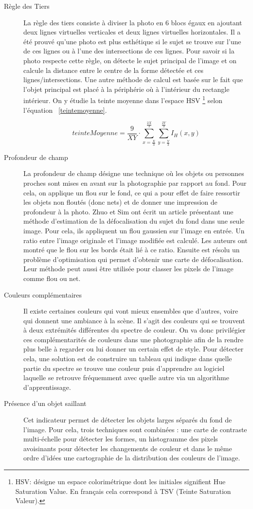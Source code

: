\documentclass[11pt, french,screen]{report-rd-info}
\begin{document}
\begin{description}
\item[Règle des Tiers]
La règle des tiers consiste à diviser la photo en 6 blocs égaux en ajoutant deux lignes virtuelles verticales et deux lignes virtuelles horizontales. Il a  été prouvé qu’une photo est plus esthétique si le sujet se trouve sur l’une de ces lignes ou à l’une des intersections de ces lignes. Pour savoir si la photo respecte cette règle, on détecte le sujet principal de l’image et on calcule la distance entre le centre de la forme détectée et ces lignes/intersections. Une autre méthode de calcul est basée sur le fait que l'objet principal est placé à la périphérie où à l'intérieur du rectangle intérieur. On y étudie la teinte moyenne dans l'espace HSV \footnote{HSV: désigne un espace colorimétrique dont les initiales signifient Hue Saturation Value. En français cela correspond à TSV (Teinte Saturation Valeur).} selon l'équation ~\ref{teintemoyenne}. 

\begin{equation}
teinteMoyenne = \frac{9}{XY}\cdot \sum_{x=\frac{X}{3}}^{\frac{2X}{3}} \sum_{y=\frac{Y}{3}}^{\frac{2Y}{3}} I_H(x,y)
\label{teintemoyenne}
\end{equation}

\item[Profondeur de champ]
La profondeur de champ désigne une technique où les objets ou personnes proches sont mises en avant sur la photographie par rapport au fond. Pour cela, on applique un flou sur  le fond, ce qui a pour effet de faire ressortir les objets non floutés (donc nets) et de donner une impression de profondeur à la photo. Zhuo et Sim ont écrit un article\cite{Zhuo2011} présentant une méthode d’estimation de la défocalisation du sujet du fond dans une seule image. Pour cela, ils appliquent un flou gaussien sur l’image en  entrée. Un ratio entre l’image originale et l’image modifiée est calculé. Les auteurs ont montré que le flou sur les bords était lié à ce ratio. Ensuite est résolu un problème d’optimisation qui permet d’obtenir une carte de défocalisation. Leur méthode peut aussi être utilisée pour classer les pixels de l’image comme flou ou net.
\item[Couleurs complémentaires]
Il existe certaines couleurs qui vont mieux ensembles que d’autres, voire qui donnent une ambiance à la scène. Il s’agit des couleurs qui se trouvent à deux extrémités différentes du spectre de couleur. On va donc privilégier ces complémentarités de couleurs dans une photographie afin de la rendre plus belle à regarder ou lui donner un certain effet de style. Pour détecter cela, une solution est de construire un tableau  qui indique dans quelle partie du spectre se trouve une couleur puis d’apprendre au logiciel laquelle se retrouve fréquemment  avec quelle autre via un algorithme d’apprentissage.
\item[Présence d'un objet saillant]
Cet indicateur permet de détecter les objets larges séparés du fond de l’image. Pour cela, trois techniques sont combinées : une carte de contraste multi-échelle pour détecter les formes, un histogramme des pixels avoisinants pour détecter les changements de couleur et dans le même ordre d’idées une cartographie de la distribution des couleurs de l’image.
\end{description}
\end{document}
